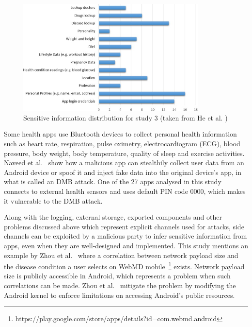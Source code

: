 \begin{figure}[t!]
	\centering
	\includegraphics[width=0.85\textwidth]{img/sensitivedistribution.jpg}
	\caption{Sensitive information distribution for study 3 (taken from  He et al. \cite{he2014security})}
	\label{fig:sensitivedistribution}
\end{figure}

Some health apps use Bluetooth devices to collect personal health information such as heart rate, respiration, pulse oximetry, electrocardiogram (ECG), blood pressure, body weight, body temperature, quality of sleep and exercise activities. Naveed et al.~\cite{naveed2014inside} show how a malicious app can stealthily collect user data from an Android device or spoof it and inject fake data into the original device's app, in what is called an \ac{DMB} attack. One of the 27 apps analysed in this study connects to external health sensors and uses default PIN code 0000, which makes it vulnerable to the \ac{DMB} attack.

Along with the logging, external storage, exported components and other problems discussed above which represent explicit channels used for attacks, side channels can be exploited by a malicious party to infer sensitive information from apps, even when they are well-designed and implemented. This study mentions an example by Zhou et al.~\cite{zhou2013identity} where a correlation between network payload size and the disease condition a user selects on WebMD mobile~\footnote{https://play.google.com/store/apps/details?id=com.webmd.android} exists. Network payload size is publicly accessible in Android, which represents a problem when such correlations can be made. Zhou et al.~\cite{zhou2013identity} mitigate the problem by modifying the Android kernel to enforce limitations on accessing Android's public resources. 

